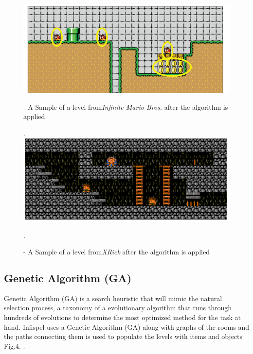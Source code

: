 \documentclass{scrartcl}
\begin{document}
\begin{figure}[h]
	\centering
	\includegraphics[width=0.9\linewidth]{Fig6}
	\caption{ - A Sample of a level from\textit{Infinite Mario Bros.} after the algorithm is applied \cite{fausto}}.
	\label{Fig2}
	\centering
	\includegraphics[width=0.9\linewidth]{Fig7}
	\caption{ - A Sample of a level from\textit{XRick} after the algorithm is applied \cite{fausto}}.
	\label{Fig3}
\end{figure}




\subsection{Genetic Algorithm (GA)}

Genetic Algorithm (GA) is a search heuristic that will mimic the natural selection process, a taxonomy of a evolutionary algorithm that runs through hundreds of evolutions to determine the most optimized method for the task at hand\cite{tax}. Infispel uses a Genetic Algorithm (GA) along with graphs of the rooms and the paths connecting them is used to populate the levels with items and objects Fig.4. \cite{walaa}.  
\end{document}
